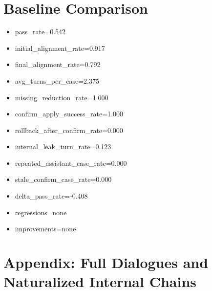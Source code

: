 \documentclass[11pt]{ctexart}
\begin{document}
\section{Baseline Comparison}
\begin{itemize}
\item pass\_rate=0.542
\item initial\_alignment\_rate=0.917
\item final\_alignment\_rate=0.792
\item avg\_turns\_per\_case=2.375
\item missing\_reduction\_rate=1.000
\item confirm\_apply\_success\_rate=1.000
\item rollback\_after\_confirm\_rate=0.000
\item internal\_leak\_turn\_rate=0.123
\item repeated\_assistant\_case\_rate=0.000
\item stale\_confirm\_case\_rate=0.000
\item delta\_pass\_rate=-0.408
\item regressions=none
\item improvements=none
\end{itemize}
\appendix
\section{Appendix: Full Dialogues and Naturalized Internal Chains}
\end{document}
